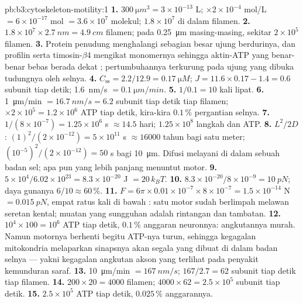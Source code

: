 \begin{solution}{pb:b3:cytoskeleton-motility:1}
\textbf{1.} $\qty{300}{\micro m^3} = 3\times 10^{-13}$ L; $\times
2\times 10^{-4}$ mol/L $= 6\times 10^{-17}$ mol $= 3.6\times 10^{7}$
molekul; $1.8\times 10^{7}$ di dalam filamen.
\textbf{2.} $1.8\times 10^{7}\times \qty{2.7}{nm} = \qty{4.9}{cm}$
filamen; pada \qty{0.25}{\micro m} masing-masing, sekitar $2\times 10^{5}$
filamen.
\textbf{3.} Protein penudung menghalangi sebagian besar ujung berdurinya, dan
profilin serta timosin-$\beta$4 mengikat monomernya sehingga aktin-ATP yang
benar-benar bebas berada dekat ; pertumbuhannya terkurung
pada ujung yang dibuka tudungnya oleh selnya.
\textbf{4.} $C_{\text{ss}} = 2.2/12.9 = \qty{0.17}{\micro M}$; $J = 11.6
\times 0.17 - 1.4 = 0.6$ subunit tiap detik; \qty{1.6}{nm/s} $=
\qty{0.1}{\micro m/min}$.
\textbf{5.} $1/0.1 = 10$ kali lipat.
\textbf{6.} \qty{1}{\micro m/min} $= \qty{16.7}{nm/s} = 6.2$ subunit tiap
detik tiap filamen; $\times 2\times 10^{5} = 1.2\times 10^{6}$ ATP tiap
detik, kira-kira $0.1\,\%$ pergantian selnya.
\textbf{7.} $1/(8\times 10^{-7}) = 1.25\times 10^{6}$ s $\approx 14.5$
hari; $1.25\times 10^{8}$ langkah dan ATP.
\textbf{8.} $L^{2}/2D$: $(1)^{2}/(2\times 10^{-12}) = 5\times 10^{11}$ s
$\approx \num{16000}$ tahun bagi satu meter; $(10^{-5})^{2}/(2\times
10^{-12}) = 50$ s bagi \qty{10}{\micro m}. Difusi melayani di dalam sebuah
badan sel; apa pun yang lebih panjang menuntut motor.
\textbf{9.} $5\times 10^{4}/6.02\times 10^{23} = 8.3\times 10^{-20}$ J
$= 20\,k_{B}T$.
\textbf{10.} $8.3\times 10^{-20}/8\times 10^{-9} = \qty{10}{pN}$;
daya gunanya $6/10 \approx 60\,\%$.
\textbf{11.} $F = 6\pi\times 0.01\times 10^{-7}\times 8\times 10^{-7} =
1.5\times 10^{-14}$ N $= \qty{0.015}{pN}$, empat ratus kali di bawah
: satu motor sudah berlimpah melawan seretan kental; muatan
yang sungguhan adalah rintangan dan tambatan.
\textbf{12.} $10^{4}\times 100 = 10^{6}$ ATP tiap detik, $0.1\,\%$ anggaran
neuronnya: angkutannya murah. Namun motornya berhenti begitu ATP-nya
turun, sehingga kegagalan mitokondria melaparkan sinapsnya akan segala yang
dibuat di dalam badan selnya --- yakni kegagalan angkutan akson yang terlihat
pada penyakit kemunduran saraf.
\textbf{13.} \qty{10}{\micro m/min} $= \qty{167}{nm/s}$; $167/2.7 = 62$
subunit tiap detik tiap filamen.
\textbf{14.} $200\times 20 = 4000$ filamen; $4000\times 62 = 2.5\times
10^{5}$ subunit tiap detik.
\textbf{15.} $2.5\times 10^{5}$ ATP tiap detik, $0.025\,\%$ anggarannya.

\end{solution}
